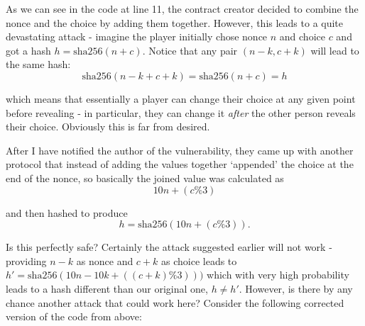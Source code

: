 \documentclass{article}
\begin{document}
    \noindent As we can see in the code at line 11, the
    contract creator decided to combine the nonce and the
    choice by adding them together. However, this leads to a
    quite devastating attack - imagine the player initially
    chose nonce \(n\) and choice \(c\) and got a hash \(h =
    \text{sha256}(n + c)\). Notice that any pair
    \((n-k,c+k)\) will lead to the same hash:
    \[
       \text{sha256}(n-k+c+k) = \text{sha256}(n+c) = h 
    \]

    \noindent which means that essentially a player can
    change their choice at any given point before revealing
    - in particular, they can change it {\itshape after} the
    other person reveals their choice. Obviously this is far
    from desired.
    \newline

    \noindent After I have notified the author of the
    vulnerability, they came up with another protocol that
    instead of adding the values together `appended' the
    choice at the end of the nonce, so basically the joined
    value was calculated as
    \[
        10n + (c\%3)
    \]

    \noindent and then hashed to produce
    \[
        h = \text{sha256}(10n + (c\%3)).
    \]

    \noindent Is this perfectly safe? Certainly the attack
    suggested earlier will not work - providing \(n - k\) as
    nonce and \(c + k\) as choice leads to \(h' =
    \text{sha256}(10n - 10k + ((c + k) \% 3)))\) which with
    very high probability leads to a hash different than our
    original one, \(h \neq h'\). However, is there by any
    chance another attack that could work here? Consider the
    following corrected version of the code from above:
\end{document}
